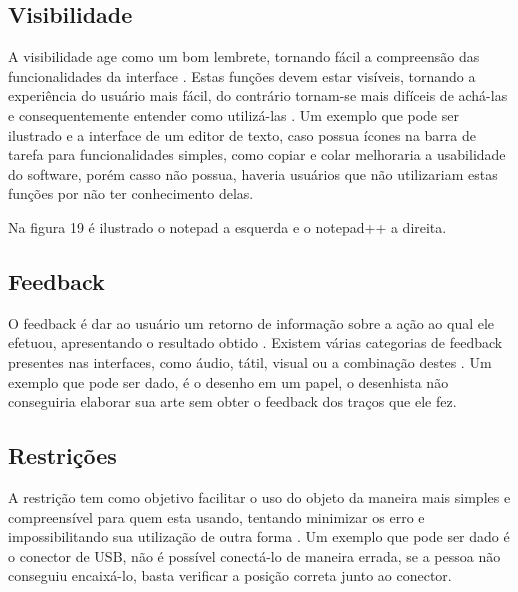 \documentclass[12pt,oneside,a4paper,chapter=TITLE,section=TITLE,sumario=tradicional]{abntex2}
\begin{document}
\subsection{Visibilidade}
\label{sec:visibilidade}

A visibilidade age como um bom lembrete, tornando fácil a compreensão das funcionalidades da interface \cite{norman2002}. Estas funções devem estar visíveis, tornando a experiência do usuário mais fácil, do contrário tornam-se mais difíceis de achá-las e consequentemente entender como utilizá-las \cite{agni2015}. Um exemplo que pode ser ilustrado e a interface de um editor de texto, caso possua ícones na barra de tarefa para funcionalidades simples, como copiar e colar melhoraria a usabilidade do software, porém casso não possua, haveria usuários que não utilizariam estas funções por não ter conhecimento delas.

Na figura 19 é ilustrado o notepad a esquerda e o notepad++ a direita.

\begin{figure}[htb]
\end{figure}

\subsection{Feedback}
\label{sec:feedback}

O feedback é dar ao usuário um retorno de informação sobre a ação ao qual ele efetuou, apresentando o resultado obtido \cite{norman2002}. Existem várias categorias de feedback presentes nas interfaces, como áudio, tátil, visual ou a combinação destes \cite{agni2015}. Um exemplo que pode ser dado, é o desenho em um papel, o desenhista não conseguiria elaborar sua arte sem obter o feedback dos traços que ele fez.

\subsection{Restrições}
\label{sec:restricoes}

A restrição tem como objetivo facilitar o uso do objeto da maneira mais simples e compreensível para quem esta usando, tentando minimizar os erro e impossibilitando sua utilização de outra forma \cite{norman2002}. Um exemplo que pode ser dado é o conector de USB, não é possível conectá-lo de maneira errada, se a pessoa não conseguiu encaixá-lo, basta verificar a posição correta junto ao conector.
\end{document}
